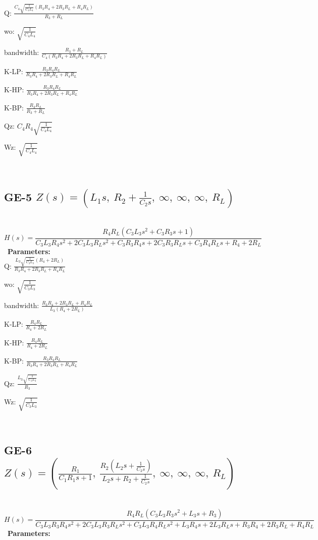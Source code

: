 \documentclass{article}
\begin{document}
Q: $\frac{C_{4} \sqrt{\frac{1}{C_{4} L_{4}}} \left(R_{3} R_{4} + 2 R_{3} R_{L} + R_{4} R_{L}\right)}{R_{3} + R_{L}}$\ 

wo: $\sqrt{\frac{1}{C_{4} L_{4}}}$\ 

bandwidth: $\frac{R_{3} + R_{L}}{C_{4} \left(R_{3} R_{4} + 2 R_{3} R_{L} + R_{4} R_{L}\right)}$\ 

K-LP: $\frac{R_{3} R_{4} R_{L}}{R_{3} R_{4} + 2 R_{3} R_{L} + R_{4} R_{L}}$\ 

K-HP: $\frac{R_{3} R_{4} R_{L}}{R_{3} R_{4} + 2 R_{3} R_{L} + R_{4} R_{L}}$\ 

K-BP: $\frac{R_{3} R_{L}}{R_{3} + R_{L}}$\ 

Qz: $C_{4} R_{4} \sqrt{\frac{1}{C_{4} L_{4}}}$\ 

Wz: $\sqrt{\frac{1}{C_{4} L_{4}}}$\ 

\ 

\subsection{GE-5 $Z(s) = \left( L_{1} s, \  R_{2} + \frac{1}{C_{2} s}, \  \infty, \  \infty, \  \infty, \  R_{L}\right)$ } \ 
\textbf{\[H(s) = \frac{R_{4} R_{L} \left(C_{3} L_{3} s^{2} + C_{3} R_{3} s + 1\right)}{C_{3} L_{3} R_{4} s^{2} + 2 C_{3} L_{3} R_{L} s^{2} + C_{3} R_{3} R_{4} s + 2 C_{3} R_{3} R_{L} s + C_{3} R_{4} R_{L} s + R_{4} + 2 R_{L}}\] } \ 
\textbf{Parameters:}\\ 

Q: $\frac{L_{3} \sqrt{\frac{1}{C_{3} L_{3}}} \left(R_{4} + 2 R_{L}\right)}{R_{3} R_{4} + 2 R_{3} R_{L} + R_{4} R_{L}}$\ 

wo: $\sqrt{\frac{1}{C_{3} L_{3}}}$\ 

bandwidth: $\frac{R_{3} R_{4} + 2 R_{3} R_{L} + R_{4} R_{L}}{L_{3} \left(R_{4} + 2 R_{L}\right)}$\ 

K-LP: $\frac{R_{4} R_{L}}{R_{4} + 2 R_{L}}$\ 

K-HP: $\frac{R_{4} R_{L}}{R_{4} + 2 R_{L}}$\ 

K-BP: $\frac{R_{3} R_{4} R_{L}}{R_{3} R_{4} + 2 R_{3} R_{L} + R_{4} R_{L}}$\ 

Qz: $\frac{L_{3} \sqrt{\frac{1}{C_{3} L_{3}}}}{R_{3}}$\ 

Wz: $\sqrt{\frac{1}{C_{3} L_{3}}}$\ 

\ 

\subsection{GE-6 $Z(s) = \left( \frac{R_{1}}{C_{1} R_{1} s + 1}, \  \frac{R_{2} \left(L_{2} s + \frac{1}{C_{2} s}\right)}{L_{2} s + R_{2} + \frac{1}{C_{2} s}}, \  \infty, \  \infty, \  \infty, \  R_{L}\right)$ } \ 
\textbf{\[H(s) = \frac{R_{4} R_{L} \left(C_{3} L_{3} R_{3} s^{2} + L_{3} s + R_{3}\right)}{C_{3} L_{3} R_{3} R_{4} s^{2} + 2 C_{3} L_{3} R_{3} R_{L} s^{2} + C_{3} L_{3} R_{4} R_{L} s^{2} + L_{3} R_{4} s + 2 L_{3} R_{L} s + R_{3} R_{4} + 2 R_{3} R_{L} + R_{4} R_{L}}\] } \ 
\textbf{Parameters:}\\ 
\end{document}
